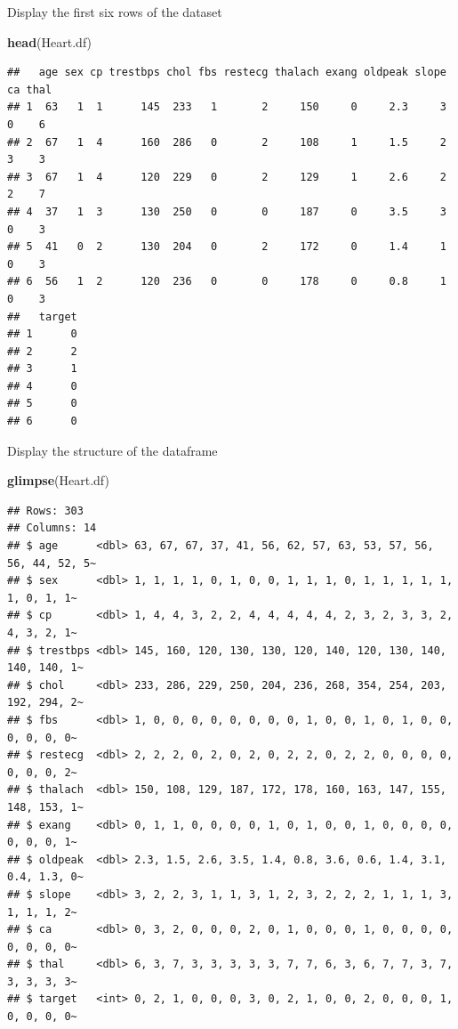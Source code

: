 \documentclass[
]{article}
\newenvironment{Shaded}{\begin{snugshade}}{\end{snugshade}}
\newcommand{\FunctionTok}[1]{\textcolor[rgb]{0.13,0.29,0.53}{\textbf{#1}}}
\newcommand{\NormalTok}[1]{#1}
\begin{document}
Display the first six rows of the dataset

\begin{Shaded}
\begin{Highlighting}[]
\FunctionTok{head}\NormalTok{(Heart.df)}
\end{Highlighting}
\end{Shaded}

\begin{verbatim}
##   age sex cp trestbps chol fbs restecg thalach exang oldpeak slope ca thal
## 1  63   1  1      145  233   1       2     150     0     2.3     3  0    6
## 2  67   1  4      160  286   0       2     108     1     1.5     2  3    3
## 3  67   1  4      120  229   0       2     129     1     2.6     2  2    7
## 4  37   1  3      130  250   0       0     187     0     3.5     3  0    3
## 5  41   0  2      130  204   0       2     172     0     1.4     1  0    3
## 6  56   1  2      120  236   0       0     178     0     0.8     1  0    3
##   target
## 1      0
## 2      2
## 3      1
## 4      0
## 5      0
## 6      0
\end{verbatim}

Display the structure of the dataframe

\begin{Shaded}
\begin{Highlighting}[]
\FunctionTok{glimpse}\NormalTok{(Heart.df)}
\end{Highlighting}
\end{Shaded}

\begin{verbatim}
## Rows: 303
## Columns: 14
## $ age      <dbl> 63, 67, 67, 37, 41, 56, 62, 57, 63, 53, 57, 56, 56, 44, 52, 5~
## $ sex      <dbl> 1, 1, 1, 1, 0, 1, 0, 0, 1, 1, 1, 0, 1, 1, 1, 1, 1, 1, 0, 1, 1~
## $ cp       <dbl> 1, 4, 4, 3, 2, 2, 4, 4, 4, 4, 4, 2, 3, 2, 3, 3, 2, 4, 3, 2, 1~
## $ trestbps <dbl> 145, 160, 120, 130, 130, 120, 140, 120, 130, 140, 140, 140, 1~
## $ chol     <dbl> 233, 286, 229, 250, 204, 236, 268, 354, 254, 203, 192, 294, 2~
## $ fbs      <dbl> 1, 0, 0, 0, 0, 0, 0, 0, 0, 1, 0, 0, 1, 0, 1, 0, 0, 0, 0, 0, 0~
## $ restecg  <dbl> 2, 2, 2, 0, 2, 0, 2, 0, 2, 2, 0, 2, 2, 0, 0, 0, 0, 0, 0, 0, 2~
## $ thalach  <dbl> 150, 108, 129, 187, 172, 178, 160, 163, 147, 155, 148, 153, 1~
## $ exang    <dbl> 0, 1, 1, 0, 0, 0, 0, 1, 0, 1, 0, 0, 1, 0, 0, 0, 0, 0, 0, 0, 1~
## $ oldpeak  <dbl> 2.3, 1.5, 2.6, 3.5, 1.4, 0.8, 3.6, 0.6, 1.4, 3.1, 0.4, 1.3, 0~
## $ slope    <dbl> 3, 2, 2, 3, 1, 1, 3, 1, 2, 3, 2, 2, 2, 1, 1, 1, 3, 1, 1, 1, 2~
## $ ca       <dbl> 0, 3, 2, 0, 0, 0, 2, 0, 1, 0, 0, 0, 1, 0, 0, 0, 0, 0, 0, 0, 0~
## $ thal     <dbl> 6, 3, 7, 3, 3, 3, 3, 3, 7, 7, 6, 3, 6, 7, 7, 3, 7, 3, 3, 3, 3~
## $ target   <int> 0, 2, 1, 0, 0, 0, 3, 0, 2, 1, 0, 0, 2, 0, 0, 0, 1, 0, 0, 0, 0~
\end{verbatim}
\end{document}
